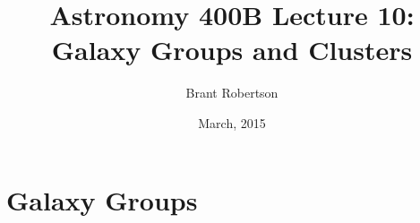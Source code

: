 \documentclass[]{article}
\title{Astronomy 400B Lecture 10: Galaxy Groups and Clusters}
\author{Brant Robertson}
\date{March, 2015}
\begin{document}
\maketitle

\section{Galaxy Groups}
\end{document}
